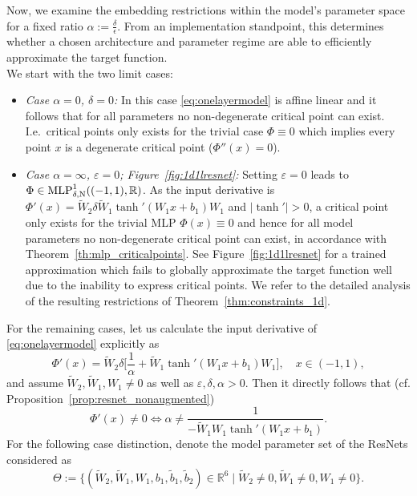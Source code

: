 \documentclass[10pt]{article}
\theoremstyle{definition}
\numberwithin{equation}{section}
\newcommand{\eps}{\varepsilon}
\newcommand{\R}{\mathbb{R}}
\newcommand{\Wt}{\widetilde{W}}
\newcommand{\bt}{\tilde{b}}
\begin{document}
Now, we examine the embedding restrictions within the model's parameter space for a fixed ratio $\alpha := \frac\delta\epsilon$. From an implementation standpoint, this determines whether a chosen architecture and parameter regime are able to efficiently approximate the target function.\\

We start with the two limit cases:
\begin{itemize}
  \item \emph{Case $\alpha = 0$, $\delta = 0$:} In this case \eqref{eq:onelayermodel} is affine linear and it follows that for all parameters no non-degenerate critical point can exist. I.e.\ critical points only exists for the trivial case $\Phi \equiv 0$ which implies every point $x$ is a degenerate critical point ($\Phi''(x) = 0$).
  
    \item  \emph{Case $\alpha = \infty$, $\eps = 0$; Figure~\ref{fig:1d1lresnet}:} Setting $\eps = 0$ leads to $\Phi\in \textup{MLP}^1_{\delta, \textup{N}}((-1,1),\R)$. As the input derivative is $\Phi'(x) = \Wt_2\delta \Wt_1 \tanh'(W_1x + b_1) W_1$ and $|\tanh'|> 0$, a critical point only exists for the trivial MLP $\Phi(x) \equiv 0$ and hence for all model parameters no non-degenerate critical point can exist, in accordance with Theorem~\ref{th:mlp_criticalpoints}. See Figure~\ref{fig:1d1lresnet} for a trained approximation which fails to globally approximate the target function well due to the inability to express critical points. We refer to the detailed analysis of the resulting restrictions of Theorem~\ref{thm:constraints_1d}.
   \end{itemize}
    
    For the remaining cases, let us calculate the input derivative of \eqref{eq:onelayermodel} explicitly as
    \begin{equation}\label{eq:phiprime}
        \Phi'(x) = \Wt_2\delta\Big[\frac1\alpha + \Wt_1 \tanh'(W_1 x + b_1) W_1\Big], \quad x\in (-1,1),
    \end{equation}
    and assume $\Wt_2, \Wt_1, W_1 \neq 0$ as well as $\eps, \delta, \alpha > 0$. Then it directly follows
    that (cf. Proposition~\ref{prop:resnet_nonaugmented})
    \begin{equation}\label{eq:directcrit}
    \Phi'(x) \neq 0 \iff \alpha \neq \frac{1}{-\Wt_1 W_1 \tanh'(W_1 x + b_1)}.
    \end{equation}
For the following case distinction, denote the model parameter set of the ResNets considered as 
\begin{equation}
    \Theta := \{(\Wt_2,\Wt_1, W_1, b_1, \bt_1, \bt_2) \in \R^6 \mid \Wt_2\neq 0, \Wt_1\neq 0, W_1 \neq 0  \}.
\end{equation}
\end{document}
